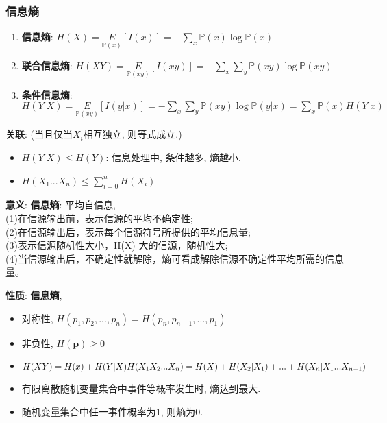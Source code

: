 \documentclass{article}
\begin{document}
        \subsubsection{信息熵}
            \begin{enumerate}
                \item \textbf{信息熵}: $H(X) = \underset{\mathbb P(x)}{E}[I(x)] = -\sum\limits_x \mathbb P(x)\log \mathbb P(x)$
                \item \textbf{联合信息熵}: $H(XY) = \underset{\mathbb P(xy)}{E}[I(xy)] = -\sum\limits_x \sum\limits_y \mathbb P(xy) \log \mathbb P(xy)$
                \item \textbf{条件信息熵}: $H(Y|X) = \underset{\mathbb P(xy)}{E}[I(y|x)] = -\sum\limits_x \sum\limits_y \mathbb P(xy) \log \mathbb P(y|x) = \sum\limits_x \mathbb P(x) H(Y|x)$
            \end{enumerate}
            
            \textbf{关联}: (当且仅当$X_i$相互独立, 则等式成立.)
            \begin{itemize}
                \item $H(Y|X) \le H(Y)$: 信息处理中, 条件越多, 熵越小.
                \item $H(X_1...X_n) \le \sum\limits_{i=0}^n H(X_i)$
            \end{itemize}
            
            \textbf{意义}: \textbf{信息熵}: 平均自信息, \\
            (1)在信源输出前，表示信源的平均不确定性;\\
            (2)在信源输出后，表示每个信源符号所提供的平均信息量;\\
            (3)表示信源随机性大小，H(X) 大的信源，随机性大;\\
            (4)当信源输出后，不确定性就解除，熵可看成解除信源不确定性平均所需的信息量。
            
            \textbf{性质}: \textbf{信息熵}, 
            \begin{itemize}
                \item 对称性, $H(p_1, p_2, ..., p_n) = H(p_n, p_{n-1}, ..., p_1)$
                \item 非负性, $H(\boldsymbol p) \ge 0$
                \item $H(XY) = H(x) + H(Y|X) \\ H(X_1 X_2 ... X_n) = H(X) + H(X_2|X_1) + ... + H(X_n|X_1...X_{n-1})$
                \item 有限离散随机变量集合中事件等概率发生时, 熵达到最大.
                \item 随机变量集合中任一事件概率为1, 则熵为0.
            \end{itemize}
            
\end{document}
